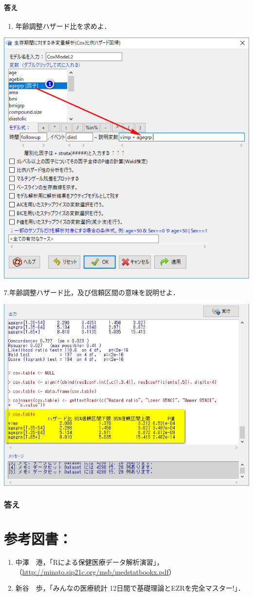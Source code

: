 \documentclass[11pt,]{problemset}
\providecommand{\tightlist}{%
  \setlength{\itemsep}{0pt}\setlength{\parskip}{0pt}}
\let\oldparagraph\paragraph
\renewcommand{\paragraph}[1]{\oldparagraph{#1}\mbox{}}
\begin{document}
\paragraph{答え}\label{-8}

\newpage

\begin{enumerate}
\def\labelenumi{\arabic{enumi}.}
\setcounter{enumi}{5}
\tightlist
\item
  年齢調整ハザード比を求めよ．
\end{enumerate}

\begin{center}\includegraphics[width=0.6\linewidth,height=0.4\textheight]{pic/survival18} \end{center}

7.年齢調整ハザード比，及び信頼区間の意味を説明せよ．

\begin{center}\includegraphics[width=0.6\linewidth,height=0.4\textheight]{pic/survival19} \end{center}

\subsubsection{答え}\label{-9}

\newpage

\vfill

\section{参考図書：}

\begin{enumerate}
\def\labelenumi{\arabic{enumi}.}
\tightlist
\item
  中澤　港，「Rによる保健医療データ解析演習」，（\url{http://minato.sip21c.org/msb/medstatbookx.pdf}）
\item
  新谷　歩，「みんなの医療統計 12日間で基礎理論とEZRを完全マスター!」．
\end{enumerate}
\end{document}
